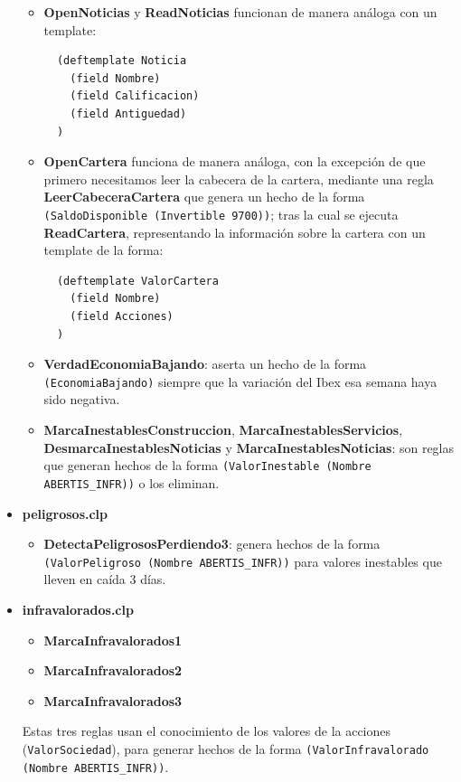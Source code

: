 \documentclass[a4paper,11pt]{article}
\begin{document}
\begin{itemize}
\begin{itemize}
  \item \textbf{OpenNoticias} y \textbf{ReadNoticias} funcionan de manera análoga con un template:
  \begin{verbatim}
  (deftemplate Noticia
    (field Nombre)
    (field Calificacion)
    (field Antiguedad)
  )
  \end{verbatim}

  \item \textbf{OpenCartera} funciona de manera análoga, con la excepción de que primero necesitamos leer la cabecera de
  la cartera, mediante una regla \textbf{LeerCabeceraCartera} que genera un hecho de la forma
  \texttt{(SaldoDisponible (Invertible 9700))}; tras la cual se ejecuta \textbf{ReadCartera}, representando la información
  sobre la cartera con un template de la forma:
  
  \begin{verbatim}
  (deftemplate ValorCartera
    (field Nombre)
    (field Acciones)
  )
  \end{verbatim}
  
  \item \textbf{VerdadEconomiaBajando}: aserta un hecho de la forma \texttt{(EconomiaBajando)} siempre que la variación del
  Ibex esa semana haya sido negativa.
  
  \item \textbf{MarcaInestablesConstruccion}, \textbf{MarcaInestablesServicios}, \textbf{DesmarcaInestablesNoticias} y \textbf{MarcaInestablesNoticias}: son reglas
  que generan hechos de la forma \texttt{(ValorInestable (Nombre ABERTIS\_INFR))} o los eliminan.

\end{itemize}

\item \textbf{peligrosos.clp}
\begin{itemize}
  \item \textbf{DetectaPeligrososPerdiendo3}: genera hechos de la forma \texttt{(ValorPeligroso (Nombre ABERTIS\_INFR))}
 para valores inestables que lleven en caída 3 días.
\end{itemize}

\item \textbf{infravalorados.clp}
\begin{itemize}
  \item \textbf{MarcaInfravalorados1}
  \item \textbf{MarcaInfravalorados2}
  \item \textbf{MarcaInfravalorados3}
\end{itemize}
  Estas tres reglas usan el conocimiento de los valores de la acciones (\texttt{ValorSociedad}), para generar hechos de
  la forma \texttt{(ValorInfravalorado (Nombre ABERTIS\_INFR))}.


\end{itemize}
\end{document}

